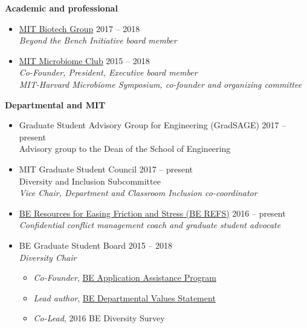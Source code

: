 \documentclass[10pt]{article}
\newenvironment{outerlist}[1][\enskip\textbullet]%
        {\begin{itemize}[#1,leftmargin=*]}{\end{itemize}%
         \vspace{-.6\baselineskip}}
\newenvironment{innerlist}[1][\enskip\textbullet]%
        {\begin{itemize}[#1,leftmargin=*,parsep=0pt,itemsep=0pt,topsep=0pt,partopsep=0pt]}
        {\end{itemize}}
\begin{document}
\textbf{Academic and professional}
\begin{outerlist}
	\item[] \href{http://biotech.mit.edu/}{MIT Biotech Group} \hfill {2017 -- 2018} \\ 
		\textit{Beyond the Bench Initiative board member} 
	\item[] \href{https://twitter.com/MITubiomeclub}{MIT Microbiome Club} \hfill {2015 -- 2018} \\ 
		\textit{Co-Founder, President, Executive board member} \\
		\textit{MIT-Harvard Microbiome Symposium, co-founder and organizing committee}
\end{outerlist}
\vspace{.15in}

\textbf{Departmental and MIT}
\begin{outerlist}
	\item[] Graduate Student Advisory Group for Engineering (GradSAGE) \hfill {2017 -- present} \\
	Advisory group to the Dean of the School of Engineering
	\item[] MIT Graduate Student Council \hfill {2017 -- present} \\
		Diversity and Inclusion Subcommittee  \\
		\textit{Vice Chair, Department and Classroom Inclusion co-coordinator} 
	\item[] \href{http://berefs.com/}{BE Resources for Easing Friction and Stress (BE REFS)} \hfill {2016 -- present} \\
	\textit{Confidential conflict management coach and graduate student advocate}
	\item[] BE Graduate Student Board \hfill {2015 -- 2018} \\ 
		\textit{Diversity Chair} 
		\begin{innerlist}
			\item[] \textit{Co-Founder}, \href{http://be.mit.edu/academic-programs/prospective-graduate/beaap}{BE Application Assistance Program} 
			\item[] \textit{Lead author}, \href{http://be.mit.edu/about/department-values-statement}{BE Departmental Values Statement}
			\item[] \textit{Co-Lead}, 2016 BE Diversity Survey
		\end{innerlist}
\end{outerlist}
\vspace{.15in}
\end{document}
